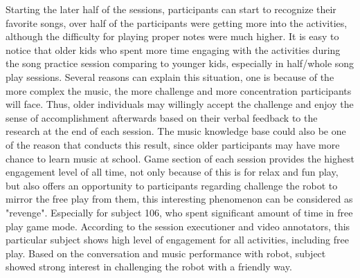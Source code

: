 Starting the later half of the sessions, participants can start to recognize their favorite songs,
over half of the participants were getting more into the activities, although the difficulty for
playing proper notes were much higher. It is easy to notice that older kids who spent more time engaging with the activities 
during the song practice session comparing to younger kids, especially in half/whole song play sessions.
Several reasons can explain this situation, one is because of the more complex the music,
the more challenge and more concentration participants will face. Thus, older individuals may willingly accept the 
challenge and enjoy the sense of accomplishment afterwards based on their verbal feedback to the research at the end of  
each session. The music knowledge base could also be one of the reason that conducts this result, 
since older participants may have more chance to learn music at school. Game section of each 
session provides the highest engagement level of all time, not only because of this is for 
relax and fun play, but also offers an opportunity to participants regarding challenge the 
robot to mirror the free play from them, this interesting phenomenon can be considered as 
"revenge". Especially for subject 106, who spent significant amount of time in free play 
game mode. According to the session executioner and video annotators, this particular subject shows 
high level of engagement for all activities, including free play. Based on the conversation 
and music performance with robot, subject showed strong interest in challenging the robot 
with a friendly way. \\

